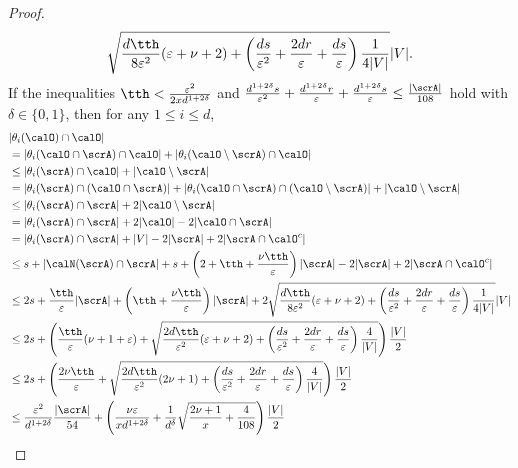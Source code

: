 \begin{proof}
$$\sqrt{\frac{d\tth}{8\varepsilon^2} (\varepsilon + \nu + 2) 
+
\left(\frac{ds}{\varepsilon^2} + \frac{2dr}\varepsilon + \frac{ds}{\varepsilon}
\right)
\frac{1}{4|V|}
}|V|.$$
If the inequalities $\tth<  \frac{\varepsilon^{2}}{2x d^{1 + 2\delta}}$ and $ \frac{ d^{1 + 2\delta} s}{\varepsilon^2 }
+ \frac{ d^{1 + 2\delta} r}{\varepsilon } + \frac{d^{1 + 2\delta} s}{\varepsilon}\leq \frac{|\scrA|}{108}$ hold with $\delta \in \{0, 1\}$, then for any $1\leq i \leq d$, 
\begin{align*}
&|\theta_i(\calO)\cap \calO |\\
& = |\theta_i(\calO\cap \scrA) \cap \calO| + |\theta_i(\calO\setminus \scrA) \cap \calO|\\
& \leq |\theta_i(\scrA) \cap \calO| + |\calO\setminus \scrA|\\
& = |\theta_i(\scrA) \cap (\calO\cap \scrA) | + |\theta_i(\calO\cap \scrA) \cap (\calO\setminus \scrA) | + |\calO\setminus \scrA|\\ 
& \leq |\theta_i(\scrA) \cap \scrA| + 2|\calO\setminus \scrA|\\ 
& = |\theta_i(\scrA) \cap \scrA| + 2|\calO| - 2|\calO\cap \scrA|\\ 
& = |\theta_i(\scrA) \cap \scrA| + |V| - 2|\scrA| + 2|\scrA\cap \calO^c|\\ 
& \leq s +  |\calN(\scrA) \cap \scrA| + s + \left(2 + \tth + \frac{\nu\tth}{\varepsilon}\right)|\scrA|- 2|\scrA| + 2|\scrA\cap \calO^c|\\ 
& \leq 2s + \frac \tth\varepsilon |\scrA| + \left( \tth + \frac{\nu\tth}{\varepsilon}\right)|\scrA| + 2\sqrt{\frac{d\tth}{8\varepsilon^2} (\varepsilon + \nu + 2) 
	+
	\left(\frac{ds}{\varepsilon^2} + \frac{2dr}\varepsilon + \frac{ds}{\varepsilon}
	\right)
	\frac{1}{4|V|}
}|V| \\
& \leq 2s + \left(\frac \tth\varepsilon (\nu+1 + \varepsilon)  + \sqrt{\frac{2d\tth}{\varepsilon^2} (\varepsilon + \nu + 2) 
+\left(\frac{ds}{\varepsilon^2} + \frac{2dr}\varepsilon + \frac{ds}{\varepsilon}
\right)
\frac{4}{|V|}
}\right) \frac{|V|}{2} \\
& \leq 2s + \left(\frac {2\nu\tth}\varepsilon + \sqrt{\frac{2d\tth}{\varepsilon^2} (2\nu + 1) 
+\left(\frac{ds}{\varepsilon^2} + \frac{2dr}\varepsilon + \frac{ds}{\varepsilon}
\right)
\frac{4}{|V|}
}\right) \frac{|V|}{2} \\
& \leq \frac{\varepsilon^2}{d^{1 + 2\delta}} \frac{|\scrA|}{54} + \left(\frac {\nu\varepsilon}{xd^{1 + 2\delta}} + \frac 1 {d^{\delta}}\sqrt{\frac{ 2\nu + 1 }{x}
+
\frac{4}{108}
}\right) \frac{|V|}{2} \\

\end{align*}
\end{proof}
